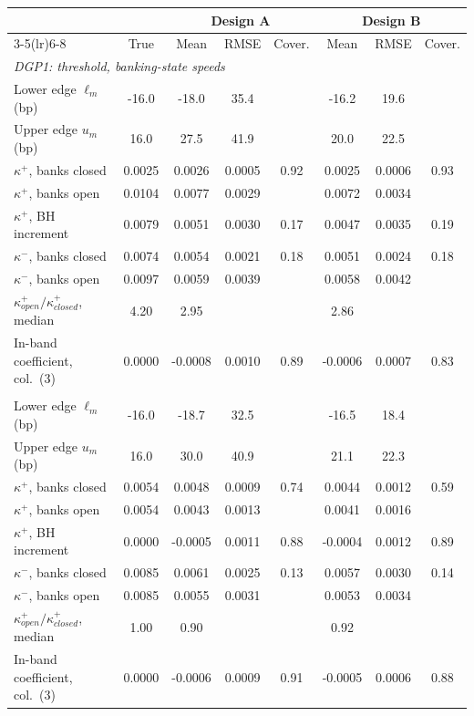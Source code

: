 \begin{tabular}{lccccccc}
\toprule
 & & \multicolumn{3}{c}{Design A} & \multicolumn{3}{c}{Design B} \\
\cmidrule(lr){3-5}\cmidrule(lr){6-8}
 & True & Mean & RMSE & Cover. & Mean & RMSE & Cover. \\
\midrule
\multicolumn{8}{l}{\textit{DGP1: threshold, banking-state speeds}} \\
Lower edge $\ell_m$ (bp) & -16.0 & -18.0 & 35.4 & & -16.2 & 19.6 & \\
Upper edge $u_m$ (bp) & 16.0 & 27.5 & 41.9 & & 20.0 & 22.5 & \\
$\kappa^+$, banks closed & 0.0025 & 0.0026 & 0.0005 & 0.92 & 0.0025 & 0.0006 & 0.93 \\
$\kappa^+$, banks open & 0.0104 & 0.0077 & 0.0029 &  & 0.0072 & 0.0034 &  \\
$\kappa^+$, BH increment & 0.0079 & 0.0051 & 0.0030 & 0.17 & 0.0047 & 0.0035 & 0.19 \\
$\kappa^-$, banks closed & 0.0074 & 0.0054 & 0.0021 & 0.18 & 0.0051 & 0.0024 & 0.18 \\
$\kappa^-$, banks open & 0.0097 & 0.0059 & 0.0039 &  & 0.0058 & 0.0042 &  \\
$\kappa^+_{open}/\kappa^+_{closed}$, median & 4.20 & 2.95 & & & 2.86 & & \\
In-band coefficient, col.\ (3) & 0.0000 & -0.0008 & 0.0010 & 0.89 & -0.0006 & 0.0007 & 0.83 \\
\addlinespace
\multicolumn{8}{l}{\textit{DGP3: threshold, same speed in both states}} \\
Lower edge $\ell_m$ (bp) & -16.0 & -18.7 & 32.5 & & -16.5 & 18.4 & \\
Upper edge $u_m$ (bp) & 16.0 & 30.0 & 40.9 & & 21.1 & 22.3 & \\
$\kappa^+$, banks closed & 0.0054 & 0.0048 & 0.0009 & 0.74 & 0.0044 & 0.0012 & 0.59 \\
$\kappa^+$, banks open & 0.0054 & 0.0043 & 0.0013 &  & 0.0041 & 0.0016 &  \\
$\kappa^+$, BH increment & 0.0000 & -0.0005 & 0.0011 & 0.88 & -0.0004 & 0.0012 & 0.89 \\
$\kappa^-$, banks closed & 0.0085 & 0.0061 & 0.0025 & 0.13 & 0.0057 & 0.0030 & 0.14 \\
$\kappa^-$, banks open & 0.0085 & 0.0055 & 0.0031 &  & 0.0053 & 0.0034 &  \\
$\kappa^+_{open}/\kappa^+_{closed}$, median & 1.00 & 0.90 & & & 0.92 & & \\
In-band coefficient, col.\ (3) & 0.0000 & -0.0006 & 0.0009 & 0.91 & -0.0005 & 0.0006 & 0.88 \\

\end{tabular}

